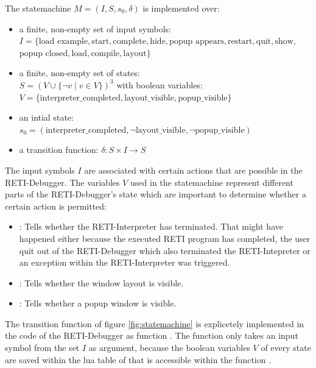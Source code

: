 \documentclass{report}
\begin{document}
The statemachine $M = (I, S, s_0, \delta)$ is implemented over:

\begin{itemize}
	\item a finite, non-empty set of \alert{input symbols}:\\
	$I = \{\text{load example}, \text{start}, \text{complete}, \text{hide}, \text{popup appears}, \text{restart}, \text{quit}, \text{show},$\\$\text{popup closed}, \text{load}, \text{compile}, \text{layout}\}$
	\item a finite, non-empty set of \alert{states}:\\
	$S = (V \cup \{\neg v \mid v\in V\})^3$ with boolean \alert{variables}:\\$V = \{\text{interpreter\_completed}, \text{layout\_visible}, \text{popup\_visible}\}$
	\item an \alert{intial state}:\\$s_0 = (\text{interpreter\_completed}, \neg\text{layout\_visible}, \neg\text{popup\_visible})$
		\item a \alert{transition function}: $\delta: S \times I \rightarrow S$
\end{itemize}

The input symbols $I$ are associated with certain actions that are possible in the RETI-Debugger. The variables $V$ used in the statemachine represent different parts of the RETI-Debugger's state which are important to determine whether a certain action is permitted:

\begin{itemize}
	\item {}: Tells whether the RETI-Interpreter has terminated. That might have happened either because the executed RETI program has completed, the user quit out of the RETI-Debugger which also terminated the RETI-Intepreter or an exception within the RETI-Interpreter was triggered.
	\item {}: Tells whether the window layout is visible.
	\item {}: Tells whether a popup window is visible.
\end{itemize}

The transition function of figure \ref{fig:statemachine} is explicetely implemented in the code of the RETI-Debugger as function . The function only takes an input symbol  from the set $I$ as argument, because the boolean variables $V$ of every state are saved within the lua table of  that is accessible within the function .
\end{document}
